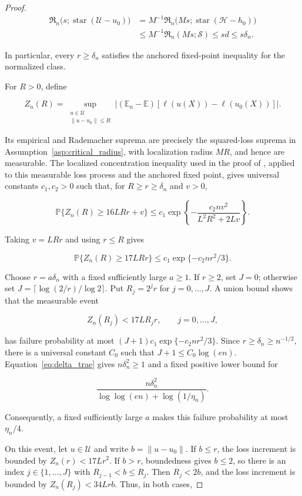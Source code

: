 \begin{proof}
{\[
\begin{split}
\mathfrak R_n\bigl(s;\operatorname{star}(\mathcal U-u_0)\bigr)
&=M^{-1}\mathfrak R_n\bigl(Ms;\operatorname{star}(\mathcal H-h_0)\bigr)\\
&\leqslant M^{-1}\mathfrak R_n(Ms;\mathcal S)
\leqslant sd\leqslant s\delta_n.
\end{split}
\]

In particular, every $r\geqslant\delta_n$ satisfies the anchored fixed-point inequality for the normalized class. 

For $R>0$, define

\[
Z_n(R)=\sup_{\substack{u\in\mathcal U\\\|u-u_0\|\leqslant R}}
\left|(\mathbb E_n-\mathbb E)[\ell(u(X))-\ell(u_0(X))]\right|.
\]

Its empirical and Rademacher suprema are precisely the squared-loss suprema in Assumption~\ref{asp:critical_radius}, with localization radius $MR$, and hence are measurable. The localized concentration inequality used in the proof of \citet[Lemma~14]{foster2023orthogonal}, applied to this measurable loss process and the anchored fixed point, gives universal constants $c_1,c_2>0$ such that, for $R\geqslant r\geqslant\delta_n$ and $v>0$,

\[
\mathbb P\{Z_n(R)\geqslant16LRr+v\}
\leqslant c_1\exp\left\{-\frac{c_2nv^2}{L^2R^2+2Lv}\right\}.
\]

Taking $v=LRr$ and using $r\leqslant R$ gives

\[
\mathbb P\{Z_n(R)\geqslant17LRr\}
\leqslant c_1\exp\{-c_2nr^2/3\}.
\]

Choose $r=a\delta_n$ with a fixed sufficiently large $a\geqslant1$. If $r\geqslant2$, set $J=0$; otherwise set $J=\lceil\log(2/r)/\log2\rceil$. Put $R_j=2^jr$ for $j=0,\ldots,J$. A union bound shows that the measurable event

\[
Z_n(R_j)<17LR_jr,\qquad j=0,\ldots,J,
\]

has failure probability at most $(J+1)c_1\exp\{-c_2nr^2/3\}$. Since $r\geqslant\delta_n\geqslant n^{-1/2}$, there is a universal constant $C_0$ such that $J+1\leqslant C_0\log(en)$. Equation~\eqref{eq:delta_trae} gives $n\delta_n^2\geqslant1$ and a fixed positive lower bound for

\[
\frac{n\delta_n^2}{\log\log(en)+\log(1/\eta_n)}.
\]

Consequently, a fixed sufficiently large $a$ makes this failure probability at most $\eta_n/4$. 

On this event, let $u\in\mathcal U$ and write $b=\|u-u_0\|$. If $b\leqslant r$, the loss increment is bounded by $Z_n(r)<17Lr^2$. If $b>r$, boundedness gives $b\leqslant2$, so there is an index $j\in\{1,\ldots,J\}$ with $R_{j-1}<b\leqslant R_j$. Then $R_j<2b$, and the loss increment is bounded by $Z_n(R_j)<34Lrb$. Thus, in both cases,

}
\end{proof}
